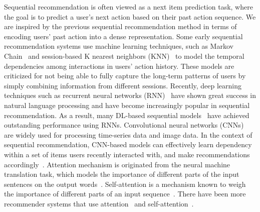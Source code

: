 Sequential recommendation is often viewed as a next item prediction task, where the goal is to predict a user's next action based on their past action sequence. 
We are inspired by the previous sequential recommendation method \cite{alibaba_seq_tfmr} in terms of encoding users' past action into a dense representation. 
Some early sequential recommendation systems use machine learning techniques, such as Markov Chain~\cite{he2016fusingMC} and session-based K nearest neighbors (KNN)~\cite{hu2020modelingknn} to model the temporal dependencies among interactions in users' action history. 
These models are criticized for not being able to fully capture the long-term patterns of users by simply combining information from different sessions. 
Recently, deep learning techniques such as recurrent neural networks (RNN)~\cite{rnn} have shown great success in natural language processing and have become increasingly popular in sequential recommendation. 
As a result, many DL-based sequential models~\cite{donkers2017sequential, hidasi2015session, tan2016improved, zhou2019deep} have achieved outstanding performance using RNNs. 
Convolutional neural networks (CNNs)~\cite{cnn} are widely used for processing time-series data and image data. 
In the context of sequential recommendation, CNN-based models can effectively learn dependency within a set of items users recently interacted with, and make recommendations accordingly~\cite{tang2018personalized, tuan20173d}.
Attention mechanism is originated from the neural machine translation task, which models the importance of different parts of the input sentences on the output words~\cite{bahdanau2014neural}.
Self-attention is a mechanism known to weigh the importance of different parts of an input sequence~\cite{tfmr}. 
There have been more recommender systems that use attention~\cite{DIN} and self-attention~\cite{zhang2019next, alibaba_seq_tfmr, li2020time, SASRec, sun2019bert4rec}. 



